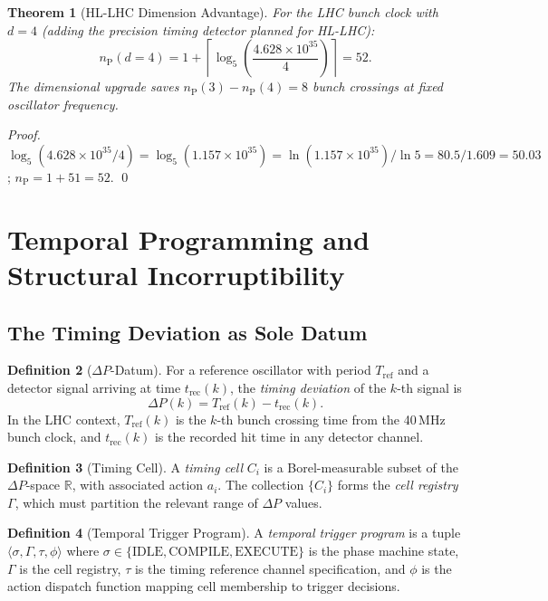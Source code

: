 \documentclass[twocolumn,10pt,a4paper]{article}
\theoremstyle{thmstyle}
\newtheorem{theorem}{Theorem}[section]
\theoremstyle{definition}
\newtheorem{definition}[theorem]{Definition}
\theoremstyle{remark}
\newcommand{\nP}{n_{\mathrm{P}}}
\newcommand{\R}{\mathbb{R}}
\newcommand{\dP}{\Delta P}
\begin{document}
\begin{theorem}[HL-LHC Dimension Advantage]
\label{thm:hllhc-advantage}
For the LHC bunch clock with $d = 4$ (adding the precision timing
detector planned for HL-LHC):
\[
\nP(d=4) = 1 + \left\lceil\log_5\!\left(\frac{4.628 \times 10^{35}}{4}\right)\right\rceil
= 52.
\]
The dimensional upgrade saves $\nP(3) - \nP(4) = 8$ bunch crossings
at fixed oscillator frequency.
\end{theorem}

\begin{proof}
$\log_5(4.628 \times 10^{35}/4) = \log_5(1.157 \times 10^{35})
= \ln(1.157 \times 10^{35})/\ln 5 = 80.5/1.609 = 50.03$;
$\nP = 1 + 51 = 52$. \qed
\end{proof}

\section{Temporal Programming and Structural Incorruptibility}
\label{sec:temporal}

\subsection{The Timing Deviation as Sole Datum}

\begin{definition}[$\dP$-Datum]
For a reference oscillator with period $T_{\mathrm{ref}}$ and a
detector signal arriving at time $t_{\mathrm{rec}}(k)$, the
\emph{timing deviation} of the $k$-th signal is
\[
\dP(k) = T_{\mathrm{ref}}(k) - t_{\mathrm{rec}}(k).
\]
In the LHC context, $T_{\mathrm{ref}}(k)$ is the $k$-th bunch crossing
time from the 40\,MHz bunch clock, and $t_{\mathrm{rec}}(k)$ is the
recorded hit time in any detector channel.
\end{definition}

\begin{definition}[Timing Cell]
A \emph{timing cell} $C_i$ is a Borel-measurable subset of the
$\dP$-space $\R$, with associated action $a_i$. The collection
$\{C_i\}$ forms the \emph{cell registry} $\Gamma$, which must
partition the relevant range of $\dP$ values.
\end{definition}

\begin{definition}[Temporal Trigger Program]
A \emph{temporal trigger program} is a tuple $\langle \sigma, \Gamma,
\tau, \phi \rangle$ where $\sigma \in \{\mathrm{IDLE}, \mathrm{COMPILE},
\mathrm{EXECUTE}\}$ is the phase machine state, $\Gamma$ is the cell
registry, $\tau$ is the timing reference channel specification, and
$\phi$ is the action dispatch function mapping cell membership to
trigger decisions.
\end{definition}
\end{document}
